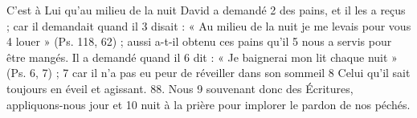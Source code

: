 C'est à Lui qu'au milieu de la nuit David a demandé	 
2	 	des pains, et il les a reçus ; car il demandait quand il	 
3	 	disait : « Au milieu de la nuit je me levais pour vous	 
4	 	louer » (Ps. 118, 62) ; aussi a-t-il obtenu ces pains qu'il	 
5	 	nous a servis pour être mangés. Il a demandé quand il	 
6	 	dit : « Je baignerai mon lit chaque nuit » (Ps. 6, 7) ;	 
7	 	car il n'a pas eu peur de réveiller dans son sommeil	 
8	 	Celui qu'il sait toujours en éveil et agissant. 88. Nous	 
9	 	souvenant donc des Écritures, appliquons-nous jour et	 
10	 	nuit à la prière pour implorer le pardon de nos péchés.